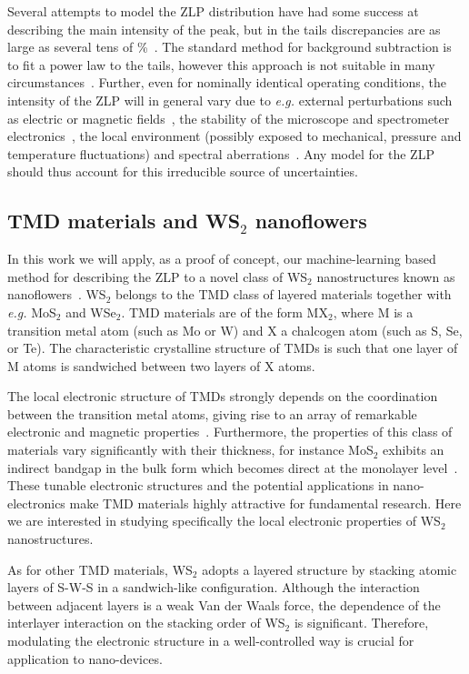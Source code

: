 Several attempts to model the ZLP distribution have had some success at describing the main intensity of the peak, 
but in the tails discrepancies are as large as several tens of \%~\cite{Bangert:2003}.
%
The standard method for background subtraction
is to fit a power law to the tails, however this approach is not suitable in
many circumstances~\cite{Hachtel:2018, Tenailleau:1992, Reed:2002, Bosman:2006}.
%
Further, even for nominally identical operating conditions, the intensity of the ZLP
will in general vary due to {\it e.g.} external perturbations such as electric or magnetic fields~\cite{Rafferty:2000},
the stability of the microscope and spectrometer electronics~\cite{Kothleitner:2003}, the local
environment (possibly exposed to mechanical, pressure and temperature fluctuations) 
and spectral aberrations~\cite{Egerton:1996}. 
%
Any model for the ZLP should thus account for this irreducible source of uncertainties.


\subsection{TMD materials and WS$_2$ nanoflowers}
\label{sec:eels}

In this work we will apply, as a proof of concept, our machine-learning based method
for describing the ZLP to a novel class of WS$_2$ nanostructures known
as nanoflowers~\cite{SabryaWS2}.
%
WS$_2$ belongs to the TMD class of layered materials together with {\it e.g.}
MoS$_2$ and WSe$_2$.
%
TMD materials are of the form MX$_2$, where M is a 
transition metal atom (such as Mo or W) and X a chalcogen atom (such as S, Se, or Te). 
%
The characteristic crystalline structure of TMDs is such that
one layer of M atoms is sandwiched between two layers of X atoms.

The local electronic structure of TMDs strongly depends on the coordination 
between the transition metal atoms, giving rise to an array of remarkable electronic
and magnetic properties~\cite{Chhowalla:2013}.
%
Furthermore, the properties of this class of materials vary significantly
with their thickness, for instance MoS$_2$ exhibits an indirect bandgap
in the bulk form which becomes direct at the monolayer level~\cite{Splendiani:2010}.
%
These tunable electronic structures and the potential applications in
nano-electronics make TMD materials highly attractive for fundamental research. 
%
Here we are interested in studying specifically the local electronic
properties of WS$_2$ nanostructures.

As for other TMD materials, WS$_2$ adopts a layered structure 
by stacking atomic layers of S-W-S in a sandwich-like configuration. 
%
Although the interaction between adjacent layers is a weak Van der Waals 
force, the dependence of the interlayer interaction on the stacking 
order of WS$_2$ is significant.
%
Therefore, modulating the electronic
structure in a well-controlled way is crucial for application to
nano-devices.

